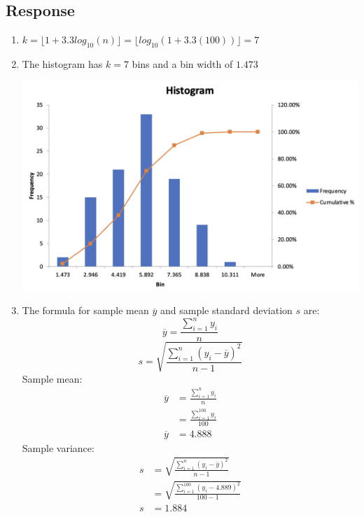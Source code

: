 \documentclass[13pt]{article}
\begin{document}
\subsection*{Response}
\begin{enumerate}[label=\alph*)]
\item $k = \lfloor 1 + 3.3log_{10}(n) \rfloor = \lfloor log_{10}(1 + 3.3(100)) \rfloor = 7$

\item The histogram has $k = 7$ bins and a bin width of $1.473$ \\
  \begin{center}
    \includegraphics[scale=0.6]{figures/histogram.png}    
  \end{center}

\item The formula for sample mean $\overline{y}$ and sample standard deviation $s$ are:
  \[\overline{y} = \frac{\sum_{i = 1}^{n} y_i}{n}\]
  \[s = \sqrt{\frac{\sum_{i = 1}^{n} (y_i - \overline{y})^2}{n - 1}}\]
  Sample mean:
  \begin{align*}
    \overline{y} &= \frac{\sum_{i = 1}^{n} y_i}{n} \\
                 &= \frac{\sum_{i = 1}^{100}y_i}{100} \\
    \overline{y} &= 4.888
  \end{align*}
  Sample variance:
  \begin{align*}
    s &= \sqrt{\frac{\sum_{i = 1}^{n} (y_i - \overline{y})^2}{n - 1}} \\
      &= \sqrt{\frac{\sum_{i = 1}^{100} (y_i - 4.889)^2}{100 - 1}} \\
    s &= 1.884
  \end{align*}
\end{enumerate}
\end{document}
